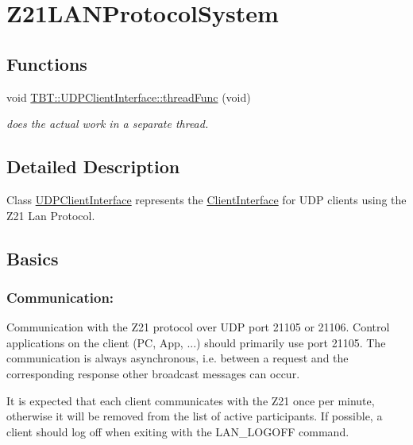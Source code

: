 \hypertarget{group__Z21LANProtocolSystem}{}\section{Z21\+L\+A\+N\+Protocol\+System}
\label{group__Z21LANProtocolSystem}
\subsection*{Functions}
\begin{DoxyCompactItemize}
\item 
void \hyperlink{group__Z21LANProtocolSystem_gabce6a58e1d8fbb71f9b08e4d5b3871c2_gabce6a58e1d8fbb71f9b08e4d5b3871c2}{T\+B\+T\+::\+U\+D\+P\+Client\+Interface\+::thread\+Func} (void)
\begin{DoxyCompactList}\small\item\em does the actual work in a separate thread. \end{DoxyCompactList}\end{DoxyCompactItemize}


\subsection{Detailed Description}
Class \hyperlink{classTBT_1_1UDPClientInterface}{U\+D\+P\+Client\+Interface} represents the \hyperlink{classTBT_1_1ClientInterface}{Client\+Interface} for U\+DP clients using the Z21 Lan Protocol.

\subsection*{Basics}

\subsubsection*{Communication\+:}

Communication with the Z21 protocol over U\+DP port 21105 or 21106. Control applications on the client (PC, App, ...) should primarily use port 21105. The communication is always asynchronous, i.\+e. between a request and the corresponding response other broadcast messages can occur.

It is expected that each client communicates with the Z21 once per minute, otherwise it will be removed from the list of active participants. If possible, a client should log off when exiting with the L\+A\+N\+\_\+\+L\+O\+G\+O\+FF command.

